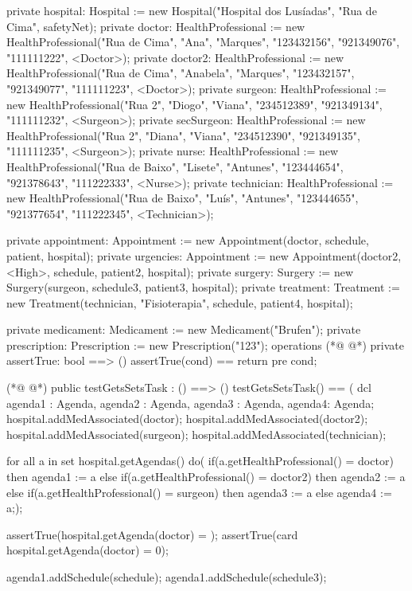 \begin{vdmpp}[breaklines=true]
  private hospital: Hospital := new Hospital("Hospital dos Lusíadas", "Rua de Cima", safetyNet);
  private doctor: HealthProfessional := new HealthProfessional("Rua de Cima", "Ana", "Marques", "123432156", "921349076", "111111222", <Doctor>);
  private doctor2: HealthProfessional := new HealthProfessional("Rua de Cima", "Anabela", "Marques", "123432157", "921349077", "111111223", <Doctor>);
  private surgeon: HealthProfessional := new HealthProfessional("Rua 2", "Diogo", "Viana", "234512389", "921349134", "111111232", <Surgeon>);
  private secSurgeon: HealthProfessional := new HealthProfessional("Rua 2", "Diana", "Viana", "234512390", "921349135", "111111235", <Surgeon>);
 private nurse: HealthProfessional := new HealthProfessional("Rua de Baixo", "Lisete", "Antunes", "123444654", "921378643", "111222333", <Nurse>);
 private technician: HealthProfessional := new HealthProfessional("Rua de Baixo", "Luís", "Antunes", "123444655", "921377654", "111222345", <Technician>);
 
 private appointment: Appointment := new Appointment(doctor, schedule, patient, hospital);
 private urgencies: Appointment := new Appointment(doctor2, <High>, schedule, patient2, hospital);
 private surgery: Surgery := new Surgery(surgeon, schedule3, patient3, hospital);
 private treatment: Treatment := new Treatment(technician, "Fisioterapia", schedule, patient4, hospital);
 
 private medicament: Medicament := new Medicament("Brufen");
 private prescription: Prescription := new Prescription("123");
operations
(*@
\label{assertTrue:59}
@*)
 private assertTrue: bool ==> ()
  assertTrue(cond) == return
 pre cond;
 
(*@
\label{testGetsSetsTask:63}
@*)
 public testGetsSetsTask : () ==> ()
  testGetsSetsTask() == (
   dcl agenda1 : Agenda, agenda2 : Agenda, agenda3 : Agenda, agenda4: Agenda;
   hospital.addMedAssociated(doctor);
   hospital.addMedAssociated(doctor2);
   hospital.addMedAssociated(surgeon);
   hospital.addMedAssociated(technician);
   
   for all a in set hospital.getAgendas() do(
    if(a.getHealthProfessional() = doctor)
     then agenda1 := a
    else if(a.getHealthProfessional() = doctor2)
     then agenda2 := a
    else if(a.getHealthProfessional() = surgeon)
     then agenda3 := a
    else
     agenda4 := a;);
   
   assertTrue(hospital.getAgenda(doctor) = {});
   assertTrue(card hospital.getAgenda(doctor) = 0);
   
   agenda1.addSchedule(schedule);
   agenda1.addSchedule(schedule3);
   

\end{vdmpp}
